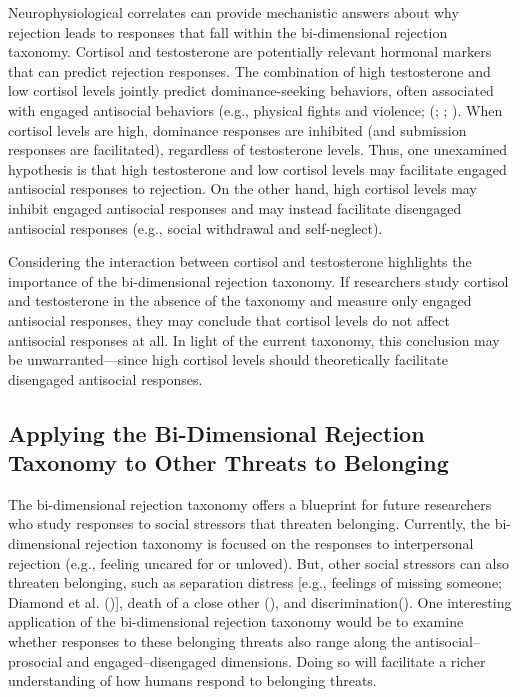 \documentclass[
]{udthesis}
\begin{document}
Neurophysiological correlates can provide mechanistic answers about why
rejection leads to responses that fall within the bi-dimensional
rejection taxonomy. Cortisol and testosterone are potentially relevant
hormonal markers that can predict rejection responses. The combination
of high testosterone and low cortisol levels jointly predict
dominance-seeking behaviors, often associated with engaged antisocial
behaviors (e.g., physical fights and violence;
(; ; ). When cortisol levels are
high, dominance responses are inhibited (and submission responses are
facilitated), regardless of testosterone levels. Thus, one unexamined
hypothesis is that high testosterone and low cortisol levels may
facilitate engaged antisocial responses to rejection. On the other hand,
high cortisol levels may inhibit engaged antisocial responses and may
instead facilitate disengaged antisocial responses (e.g., social
withdrawal and self-neglect).

Considering the interaction between cortisol and testosterone highlights
the importance of the bi-dimensional rejection taxonomy. If researchers
study cortisol and testosterone in the absence of the taxonomy and
measure only engaged antisocial responses, they may conclude that
cortisol levels do not affect antisocial responses at all. In light of
the current taxonomy, this conclusion may be unwarranted---since high
cortisol levels should theoretically facilitate disengaged antisocial
responses.

\subsection{Applying the Bi-Dimensional Rejection Taxonomy to Other Threats to Belonging}\label{applying-the-bi-dimensional-rejection-taxonomy-to-other-threats-to-belonging}

The bi-dimensional rejection taxonomy offers a blueprint for future
researchers who study responses to social stressors that threaten
belonging. Currently, the bi-dimensional rejection taxonomy is focused
on the responses to interpersonal rejection (e.g., feeling uncared for
or unloved). But, other social stressors can also threaten belonging,
such as separation distress {[}e.g., feelings of missing someone;
Diamond et al. (){]}, death of a close other
(), and
discrimination(). One
interesting application of the bi-dimensional rejection taxonomy would
be to examine whether responses to these belonging threats also range
along the antisocial--prosocial and engaged--disengaged dimensions.
Doing so will facilitate a richer understanding of how humans respond to
belonging threats.
\end{document}

